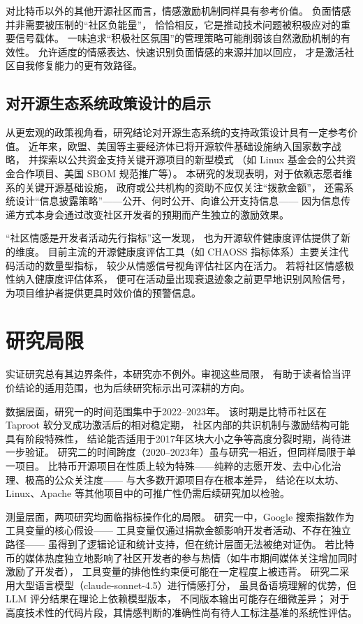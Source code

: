 对比特币以外的其他开源社区而言，情感激励机制同样具有参考价值。
负面情感并非需要被压制的“社区负能量”，
恰恰相反，它是推动技术问题被积极应对的重要信号载体。
一味追求“积极社区氛围”的管理策略可能削弱该自然激励机制的有效性。
允许适度的情感表达、快速识别负面情感的来源并加以回应，
才是激活社区自我修复能力的更有效路径。

\subsection{对开源生态系统政策设计的启示}

从更宏观的政策视角看，研究结论对开源生态系统的支持政策设计具有一定参考价值。
近年来，欧盟、美国等主要经济体已将开源软件基础设施纳入国家数字战略，
并探索以公共资金支持关键开源项目的新型模式
（如 Linux 基金会的公共资金合作项目、美国 SBOM 规范推广等）。
本研究的发现表明，对于依赖志愿者维系的关键开源基础设施，
政府或公共机构的资助不应仅关注“拨款金额”，
还需系统设计“信息披露策略”——公开、何时公开、向谁公开支持信息——
因为信息传递方式本身会通过改变社区开发者的预期而产生独立的激励效果。

“社区情感是开发者活动先行指标”这一发现，
也为开源软件健康度评估提供了新的维度。
目前主流的开源健康度评估工具（如 CHAOSS 指标体系）主要关注代码活动的数量型指标，
较少从情感信号视角评估社区内在活力。
若将社区情感极性纳入健康度评估体系，
便可在活动量出现衰退迹象之前更早地识别风险信号，
为项目维护者提供更具时效价值的预警信息。


\section{研究局限}

实证研究总有其边界条件，本研究亦不例外。审视这些局限，
有助于读者恰当评价结论的适用范围，也为后续研究标示出可深耕的方向。

数据层面，研究一的时间范围集中于2022--2023年。
该时期是比特币社区在 Taproot 软分叉成功激活后的相对稳定期，
社区内部的共识机制与激励结构可能具有阶段特殊性，
结论能否适用于2017年区块大小之争等高度分裂时期，尚待进一步验证。
研究二的时间跨度（2020--2023年）虽与研究一相近，但同样局限于单一项目。
比特币开源项目在性质上较为特殊——纯粹的志愿开发、去中心化治理、极高的公众关注度——
与大多数开源项目存在根本差异，
结论在以太坊、Linux、Apache 等其他项目中的可推广性仍需后续研究加以检验。

测量层面，两项研究均面临指标操作化的局限。
研究一中，Google 搜索指数作为工具变量的核心假设——
工具变量仅通过捐款金额影响开发者活动、不存在独立路径——
虽得到了逻辑论证和统计支持，但在统计层面无法被绝对证伪。
若比特币的媒体热度独立地影响了社区开发者的参与热情（如牛市期间媒体关注增加同时激励了开发者），
工具变量的排他性约束便可能在一定程度上被违背。
研究二采用大型语言模型（claude-sonnet-4.5）进行情感打分，
虽具备语境理解的优势，但 LLM 评分结果在理论上依赖模型版本，
不同版本输出可能存在细微差异；
对于高度技术性的代码片段，其情感判断的准确性尚有待人工标注基准的系统性评估。

